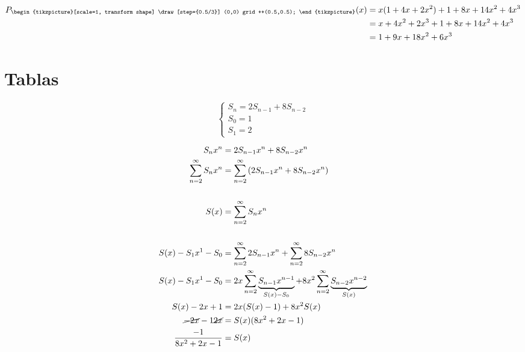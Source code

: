 \documentclass[../main.tex]{subfiles}
\begin{document}
\begin{align*}
	P_
	{
		\begin{tikzpicture}[scale=1, transform shape]
			\draw[step={0.5/3}] (0,0) grid ++(0.5,0.5);
		\end{tikzpicture}
	}(x)
	&= x(1+4x+2x^2)+1+8x+14x^2+4x^3\\
	&= x+4x^2+2x^3+1+8x+14x^2+4x^3\\
	&= 1+9x+18x^2+6x^3
\end{align*}

\section{Tablas}%
\label{sec:tablas}
\[
	\begin{cases}
		S_n = 2S_{n-1}+8S_{n-2}\\
		S_0 = 1\\
		S_1 = 2
	\end{cases}
\]

\begin{align*}
	S_nx^n&=2S_{n-1}x^n+8S_{n-2}x^n\\
	\sum_{n=2}^\infty
	S_nx^n &=
	\sum_{n=2}^\infty
	\left(
		2S_{n-1}x^n+8S_{n-2}x^n
	\right)\\
	\\
	S(x) &=
	\sum_{n=2}^\infty
	S_nx^n\\
	\\
	S(x)-S_1x^1-S_0&=
	\sum_{n=2}^\infty
	2S_{n-1}x^n
	+
	\sum_{n=2}^\infty
	8S_{n-2}x^n\\
	S(x)-S_1x^1-S_0&=
	2x
	\sum_{n=2}^\infty
	\underbrace
	{
		S_{n-1}x^{n-1}
	}_
	{
		S(x)-S_0
	}
	+
	8x^2
	\sum_{n=2}^\infty
	\underbrace
	{
		S_{n-2}x^{n-2}
	}_
	{
		S(x)
	}\\
	S(x)-2x+1 &=
	2x(S(x)-1)+8x^2S(x)\\
	\cancel{-2x}
	-1
	\cancel{2x} &=
	S(x)(8x^2+2x-1)\\
	\frac{-1}{8x^2+2x-1} &= S(x)
\end{align*}
\end{document}
